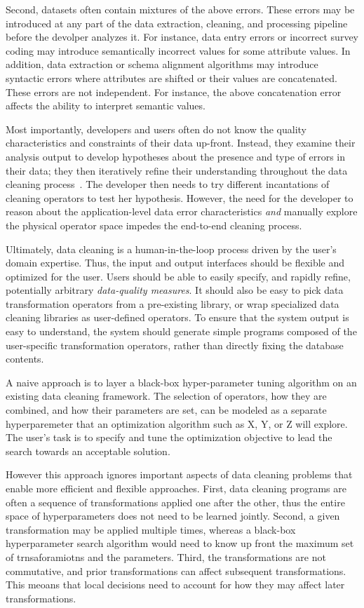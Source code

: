 Second, datasets often contain mixtures of the above errors.  These errors may be introduced at any part of the data extraction, cleaning, and processing pipeline before the devolper analyzes it.  For instance, data entry errors or incorrect survey coding may introduce semantically incorrect values for some attribute values.  In addition, data extraction or schema alignment algorithms may introduce syntactic errors where attributes are shifted or their values are concatenated.  These errors are not independent. For instance, the above concatenation error affects the ability to interpret semantic values.  

Most importantly, developers and users often do not know the quality characteristics and constraints of their data up-front.  Instead, they examine their analysis output to develop hypotheses about the presence and type of errors in their data; they then iteratively refine their understanding throughout the data cleaning process~\cite{krishnan2016hilda}.  The developer then needs to try different incantations of cleaning operators to test her hypothesis.   However, the need for the developer to reason about the application-level data error characteristics {\it and} manually explore the physical operator space impedes the end-to-end cleaning process.   

Ultimately, data cleaning is a human-in-the-loop process driven by the user's domain expertise.  Thus, the input and output interfaces should be flexible and optimized for the user.   Users should be able to easily specify, and rapidly refine, potentially arbitrary {\it data-quality measures}.  It should also be easy to pick data transformation operators from a pre-existing library, or wrap specialized data cleaning libraries as user-defined operators.  To ensure that the system output is easy to understand, the system should generate simple programs composed of the user-specific transformation operators, rather than directly fixing the database contents.

A naive approach is to layer a black-box hyper-parameter tuning algorithm on an existing data cleaning framework.  The selection of operators, how they are combined, and how their parameters are set, can be modeled as a separate hyperparemeter that an optimization algorithm such as X, Y, or Z will explore.  The user's task is to specify and tune the optimization objective to lead the search towards an acceptable solution.   

However this approach ignores important aspects of data cleaning problems that enable more efficient and flexible approaches.  First, data cleaning programs are often a sequence of transformations applied one after the other, thus the entire space of hyperparameters does not need to be learned jointly.  Second, a given transformation may be applied multiple times, whereas a black-box hyperparameter search algorithm would need to know up front the maximum set of trnsaforamiotns and the parameters. Third, the transformations are not commutative, and prior transformations can affect subsequent transformations.  This meoans that local decisions need to account for how they may affect later transformations.  


